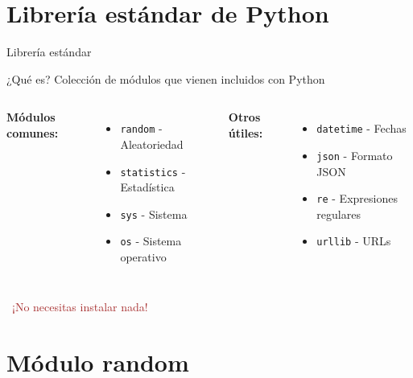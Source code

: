 \documentclass{beamer}
\begin{document}
\section{Librería estándar de Python}

\begin{frame}{Librería estándar \faBook}
\begin{conceptbox}{¿Qué es?}
Colección de módulos que vienen incluidos con Python
\end{conceptbox}

\vspace{0.2cm}
\begin{columns}[T]
\textbf{Módulos comunes:}
\small
\begin{itemize}
    \item[\faDice] \texttt{random} - Aleatoriedad
    \item[\faChartBar] \texttt{statistics} - Estadística
    \item[\faTerminal] \texttt{sys} - Sistema
    \item[\faFolder] \texttt{os} - Sistema operativo
\end{itemize}

\textbf{Otros útiles:}
\small
\begin{itemize}
    \item[\faClock] \texttt{datetime} - Fechas
    \item[\faFile] \texttt{json} - Formato JSON
    \item[\faExchangeAlt] \texttt{re} - Expresiones regulares
    \item[\faGlobe] \texttt{urllib} - URLs
\end{itemize}
\end{columns}

\vspace{0.3cm}
\begin{center}
\textcolor{brown}{\faInfoCircle\ ¡No necesitas instalar nada!}
\end{center}
\end{frame}

\section{Módulo random}
\end{document}
